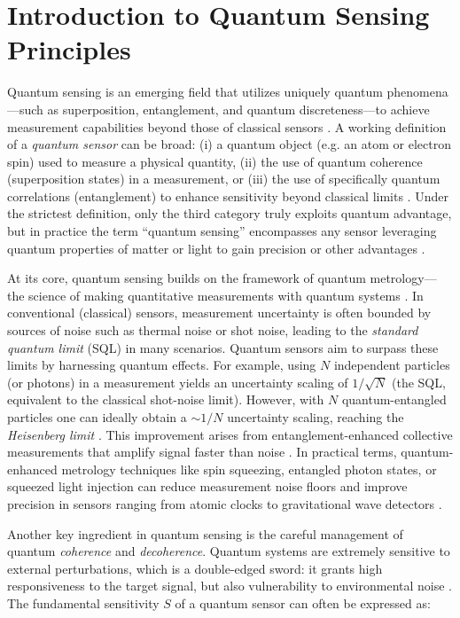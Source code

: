 
\section{Introduction to Quantum Sensing Principles}

Quantum sensing is an emerging field that utilizes uniquely quantum
phenomena—such as superposition, entanglement, and quantum
discreteness—to achieve measurement capabilities beyond those of
classical sensors . A working definition of a \emph{quantum sensor}
can be broad: (i) a quantum object (e.g. an atom or electron spin)
used to measure a physical quantity, (ii) the use of quantum coherence
(superposition states) in a measurement, or (iii) the use of
specifically quantum correlations (entanglement) to enhance
sensitivity beyond classical limits . Under the strictest definition,
only the third category truly exploits quantum advantage, but in
practice the term “quantum sensing” encompasses any sensor leveraging
quantum properties of matter or light to gain precision or other
advantages .



At its core, quantum sensing builds on the framework of quantum
metrology—the science of making quantitative measurements with quantum
systems . In conventional (classical) sensors, measurement uncertainty
is often bounded by sources of noise such as thermal noise or shot
noise, leading to the \textit{standard quantum limit} (SQL) in many
scenarios. Quantum sensors aim to surpass these limits by harnessing
quantum effects. For example, using $N$ independent particles (or
photons) in a measurement yields an uncertainty scaling of
$1/\sqrt{N}$ (the SQL, equivalent to the classical shot-noise
limit). However, with $N$ quantum-entangled particles one can ideally
obtain a $\sim 1/N$ uncertainty scaling, reaching the \emph{Heisenberg
limit} . This improvement arises from entanglement-enhanced collective
measurements that amplify signal faster than noise . In practical
terms, quantum-enhanced metrology techniques like spin squeezing,
entangled photon states, or squeezed light injection can reduce
measurement noise floors and improve precision in sensors ranging from
atomic clocks to gravitational wave detectors .



Another key ingredient in quantum sensing is the careful management of
quantum \textit{coherence} and \textit{decoherence}. Quantum systems
are extremely sensitive to external perturbations, which is a
double-edged sword: it grants high responsiveness to the target
signal, but also vulnerability to environmental noise . The
fundamental sensitivity $S$ of a quantum sensor can often be expressed
as:

